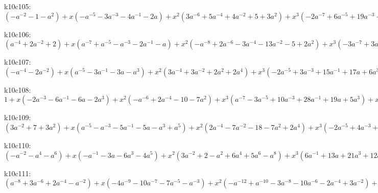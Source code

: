 k10c105: $ (-a^{-2}-1-a^{2}) +x(-a^{-5}-3a^{-3}-4a^{-1}-2a) +x^{2}(3a^{-6}+5a^{-4}+4a^{-2}+5+3a^{2}) +x^{3}(-2a^{-7}+6a^{-5}+19a^{-3}+18a^{-1}+7a) +x^{4}(a^{-8}-8a^{-6}-9a^{-4}+2a^{-2}-1-3a^{2}) +x^{5}(4a^{-7}-13a^{-5}-33a^{-3}-24a^{-1}-8a) +x^{6}(8a^{-6}-3a^{-4}-19a^{-2}-7+a^{2}) +x^{7}(10a^{-5}+13a^{-3}+6a^{-1}+3a) +x^{8}(7a^{-4}+11a^{-2}+4) +x^{9}(2a^{-3}+2a^{-1}) $

k10c106: $ (a^{-4}+2a^{-2}+2) +x(a^{-7}+a^{-5}-a^{-3}-2a^{-1}-a) +x^{2}(-a^{-8}+2a^{-6}-3a^{-4}-13a^{-2}-5+2a^{2}) +x^{3}(-3a^{-7}+3a^{-5}+8a^{-3}+9a^{-1}+7a) +x^{4}(a^{-8}-5a^{-6}+4a^{-4}+22a^{-2}+9-3a^{2}) +x^{5}(3a^{-7}-7a^{-5}-13a^{-3}-12a^{-1}-9a) +x^{6}(5a^{-6}-6a^{-4}-23a^{-2}-11+a^{2}) +x^{7}(6a^{-5}+4a^{-3}+a^{-1}+3a) +x^{8}(5a^{-4}+9a^{-2}+4) +x^{9}(2a^{-3}+2a^{-1}) $

k10c107: $ (-a^{-4}-2a^{-2}) +x(a^{-5}-3a^{-1}-3a-a^{3}) +x^{2}(3a^{-4}+3a^{-2}+2a^{2}+2a^{4}) +x^{3}(-2a^{-5}+3a^{-3}+15a^{-1}+17a+6a^{3}-a^{5}) +x^{4}(-5a^{-4}-2a^{-2}+5-4a^{2}-6a^{4}) +x^{5}(a^{-5}-7a^{-3}-22a^{-1}-27a-12a^{3}+a^{5}) +x^{6}(3a^{-4}-4a^{-2}-16-5a^{2}+4a^{4}) +x^{7}(5a^{-3}+9a^{-1}+11a+7a^{3}) +x^{8}(5a^{-2}+11+6a^{2}) +x^{9}(2a^{-1}+2a) $

k10c108: $ 1 +x(-2a^{-3}-6a^{-1}-6a-2a^{3}) +x^{2}(-a^{-6}+2a^{-4}-10-7a^{2}) +x^{3}(a^{-7}-3a^{-5}+10a^{-3}+28a^{-1}+19a+5a^{3}) +x^{4}(3a^{-6}-9a^{-4}+4a^{-2}+33+17a^{2}) +x^{5}(5a^{-5}-17a^{-3}-29a^{-1}-11a-4a^{3}) +x^{6}(7a^{-4}-13a^{-2}-33-13a^{2}) +x^{7}(8a^{-3}+4a^{-1}-3a+a^{3}) +x^{8}(6a^{-2}+9+3a^{2}) +x^{9}(2a^{-1}+2a) $

k10c109: $ (3a^{-2}+7+3a^{2}) +x(a^{-5}-a^{-3}-5a^{-1}-5a-a^{3}+a^{5}) +x^{2}(2a^{-4}-7a^{-2}-18-7a^{2}+2a^{4}) +x^{3}(-2a^{-5}+4a^{-3}+13a^{-1}+13a+4a^{3}-2a^{5}) +x^{4}(-5a^{-4}+6a^{-2}+22+6a^{2}-5a^{4}) +x^{5}(a^{-5}-8a^{-3}-16a^{-1}-16a-8a^{3}+a^{5}) +x^{6}(3a^{-4}-7a^{-2}-20-7a^{2}+3a^{4}) +x^{7}(5a^{-3}+6a^{-1}+6a+5a^{3}) +x^{8}(5a^{-2}+10+5a^{2}) +x^{9}(2a^{-1}+2a) $

k10c110: $ (-a^{-2}-a^{4}-a^{6}) +x(-a^{-1}-3a-6a^{3}-4a^{5}) +x^{2}(3a^{-2}+2-a^{2}+6a^{4}+5a^{6}-a^{8}) +x^{3}(6a^{-1}+13a+21a^{3}+12a^{5}-2a^{7}) +x^{4}(-3a^{-2}+1+8a^{2}-4a^{4}-7a^{6}+a^{8}) +x^{5}(-8a^{-1}-19a-27a^{3}-13a^{5}+3a^{7}) +x^{6}(a^{-2}-8-20a^{2}-5a^{4}+6a^{6}) +x^{7}(3a^{-1}+4a+9a^{3}+8a^{5}) +x^{8}(4+10a^{2}+6a^{4}) +x^{9}(2a+2a^{3}) $

k10c111: $ (a^{-8}+3a^{-6}+2a^{-4}-a^{-2}) +x(-4a^{-9}-10a^{-7}-7a^{-5}-a^{-3}) +x^{2}(-a^{-12}+a^{-10}-3a^{-8}-10a^{-6}-2a^{-4}+3a^{-2}) +x^{3}(-3a^{-11}+13a^{-9}+30a^{-7}+19a^{-5}+5a^{-3}) +x^{4}(a^{-12}-5a^{-10}+10a^{-8}+22a^{-6}+3a^{-4}-3a^{-2}) +x^{5}(3a^{-11}-13a^{-9}-28a^{-7}-20a^{-5}-8a^{-3}) +x^{6}(5a^{-10}-11a^{-8}-26a^{-6}-9a^{-4}+a^{-2}) +x^{7}(7a^{-9}+7a^{-7}+3a^{-5}+3a^{-3}) +x^{8}(6a^{-8}+10a^{-6}+4a^{-4}) +x^{9}(2a^{-7}+2a^{-5}) $


